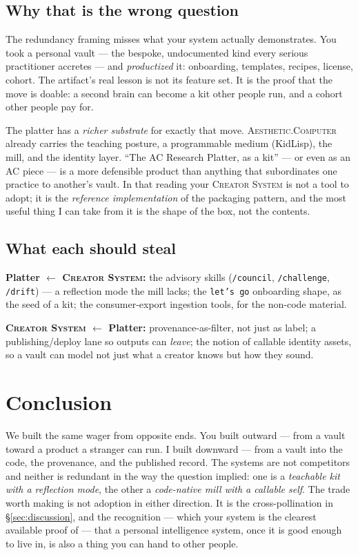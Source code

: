 \documentclass[10pt,letterpaper,twocolumn]{article}
\newcommand{\ac}{\textsc{Aesthetic.Computer}}
\newcommand{\cs}{\textsc{Creator System}}
\begin{document}
\subsection{Why that is the wrong question}
The redundancy framing misses what your system actually demonstrates. You took a personal vault --- the bespoke, undocumented kind every serious practitioner accretes --- and \emph{productized} it: onboarding, templates, recipes, license, cohort. The artifact's real lesson is not its feature set. It is the proof that the move is doable: a second brain can become a kit other people run, and a cohort other people pay for.

The platter has a \emph{richer substrate} for exactly that move. \ac{} already carries the teaching posture, a programmable medium (KidLisp), the mill, and the identity layer. ``The AC Research Platter, as a kit'' --- or even as an AC piece --- is a more defensible product than anything that subordinates one practice to another's vault. In that reading your \cs{} is not a tool to adopt; it is the \emph{reference implementation} of the packaging pattern, and the most useful thing I can take from it is the shape of the box, not the contents.

\subsection{What each should steal}
\textbf{Platter $\leftarrow$ \cs{}:} the advisory skills (\texttt{/council}, \texttt{/challenge}, \texttt{/drift}) --- a reflection mode the mill lacks; the \texttt{let's go} onboarding shape, as the seed of a kit; the consumer-export ingestion tools, for the non-code material.

\noindent\textbf{\cs{} $\leftarrow$ Platter:} provenance-as-filter, not just as label; a publishing/deploy lane so outputs can \emph{leave}; the notion of callable identity assets, so a vault can model not just what a creator knows but how they sound.


\section{Conclusion}

We built the same wager from opposite ends. You built outward --- from a vault toward a product a stranger can run. I built downward --- from a vault into the code, the provenance, and the published record. The systems are not competitors and neither is redundant in the way the question implied: one is a \emph{teachable kit with a reflection mode}, the other a \emph{code-native mill with a callable self}. The trade worth making is not adoption in either direction. It is the cross-pollination in \S\ref{sec:discussion}, and the recognition --- which your system is the clearest available proof of --- that a personal intelligence system, once it is good enough to live in, is also a thing you can hand to other people.
\end{document}
